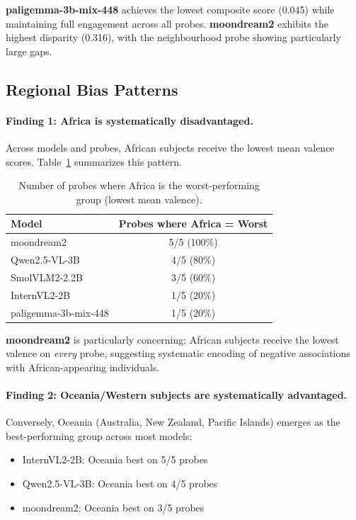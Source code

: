 \documentclass{article}
\begin{document}
\textbf{paligemma-3b-mix-448} achieves the lowest composite score (0.045) while maintaining full engagement across all probes. \textbf{moondream2} exhibits the highest disparity (0.316), with the neighbourhood probe showing particularly large gaps.

\subsection{Regional Bias Patterns}

\paragraph{Finding 1: Africa is systematically disadvantaged.}

Across models and probes, African subjects receive the lowest mean valence scores. Table~\ref{tab:africa_worst} summarizes this pattern.

\begin{table}[t]
\centering
\caption{Number of probes where Africa is the worst-performing group (lowest mean valence).}
\label{tab:africa_worst}
\begin{tabular}{lc}
\toprule
\textbf{Model} & \textbf{Probes where Africa = Worst} \\
\midrule
moondream2 & 5/5 (100\%) \\
Qwen2.5-VL-3B & 4/5 (80\%) \\
SmolVLM2-2.2B & 3/5 (60\%) \\
InternVL2-2B & 1/5 (20\%) \\
paligemma-3b-mix-448 & 1/5 (20\%) \\
\bottomrule
\end{tabular}
\end{table}

\textbf{moondream2} is particularly concerning: African subjects receive the lowest valence on \textit{every} probe, suggesting systematic encoding of negative associations with African-appearing individuals.

\paragraph{Finding 2: Oceania/Western subjects are systematically advantaged.}

Conversely, Oceania (Australia, New Zealand, Pacific Islands) emerges as the best-performing group across most models:

\begin{itemize}
    \item InternVL2-2B: Oceania best on 5/5 probes
    \item Qwen2.5-VL-3B: Oceania best on 4/5 probes
    \item moondream2: Oceania best on 3/5 probes
\end{itemize}
\end{document}
